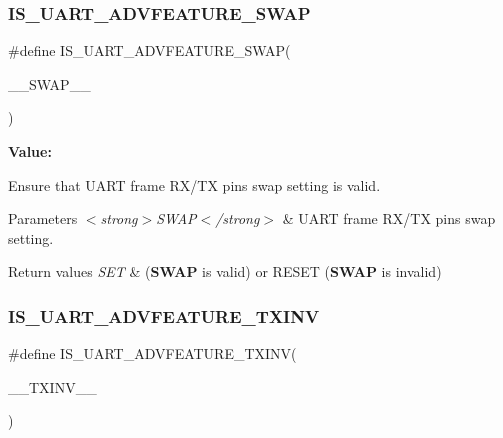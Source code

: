\subsubsection{\texorpdfstring{IS\_UART\_ADVFEATURE\_SWAP}{IS\_UART\_ADVFEATURE\_SWAP}}
{\footnotesize\ttfamily \#define I\+S\+\_\+\+U\+A\+R\+T\+\_\+\+A\+D\+V\+F\+E\+A\+T\+U\+R\+E\+\_\+\+S\+W\+AP(\begin{DoxyParamCaption}\item[{}]{\+\_\+\+\_\+\+S\+W\+A\+P\+\_\+\+\_\+ }\end{DoxyParamCaption})}

{\bfseries Value\+:}
\begin{DoxyCode}{0}

\end{DoxyCode}


Ensure that U\+A\+RT frame R\+X/\+TX pins swap setting is valid. 


\begin{DoxyParams}{Parameters}
{\em $<$strong$>$\+S\+W\+A\+P$<$/strong$>$} & U\+A\+RT frame R\+X/\+TX pins swap setting. \\
\hline
\end{DoxyParams}

\begin{DoxyRetVals}{Return values}
{\em S\+ET} & ({\bfseries{S\+W\+AP}} is valid) or R\+E\+S\+ET ({\bfseries{S\+W\+AP}} is invalid) \\
\hline
\end{DoxyRetVals}
\mbox{\label{group___u_a_r_t___private___macros_ga4295a61b0afe152975609cedb9034fdc}} 
\subsubsection{\texorpdfstring{IS\_UART\_ADVFEATURE\_TXINV}{IS\_UART\_ADVFEATURE\_TXINV}}
{\footnotesize\ttfamily \#define I\+S\+\_\+\+U\+A\+R\+T\+\_\+\+A\+D\+V\+F\+E\+A\+T\+U\+R\+E\+\_\+\+T\+X\+I\+NV(\begin{DoxyParamCaption}\item[{}]{\+\_\+\+\_\+\+T\+X\+I\+N\+V\+\_\+\+\_\+ }\end{DoxyParamCaption})}

